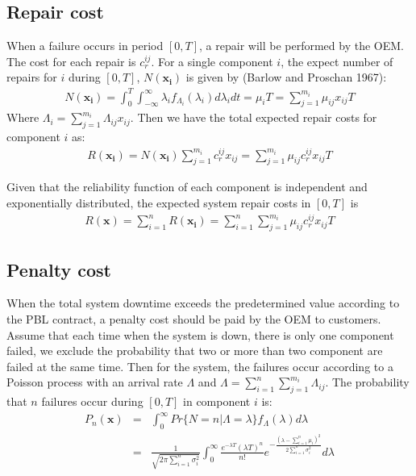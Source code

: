 \documentclass[preprint,12pt]{elsarticle}
\begin{document}
\subsection{Repair cost}
	
When a failure occurs in period $[0, T]$, a repair will be performed by the OEM. The cost for each repair is $c_r^{ij}$. For a single component $i$, the expect number of repairs for $i$ during $[0,T]$, $N(\boldsymbol{x_{i}})$ is given by (Barlow and Proschan 1967):
\begin {eqnarray}
N(\boldsymbol{x_{i}})=\int_0^{T}\int_{-\infty}^{\infty}{{\lambda}_{i}f_{\Lambda_{i}}({\lambda}_{i})d{\lambda}_{i}dt}=\mu_{i}T=\sum_{j=1}^{m_{i}}{\mu_{ij}x_{ij}}T
\end {eqnarray}
Where $\Lambda_{i}=\sum_{j=1}^{m_{i}}{\Lambda}_{ij}x_{ij}$. Then we have the total expected repair costs for component $i$ as:
\begin {eqnarray}
R(\boldsymbol{x_{i}})=N(\boldsymbol{x_{i}})\sum_{j=1}^{m_{i}}{c_r^{ij}x_{ij}}=\sum_{j=1}^{m_{i}}{\mu_{ij}c_r^{ij}x_{ij}}T
\end {eqnarray}

Given that the reliability function of each component is independent and exponentially distributed, the expected system repair costs in $[0,T]$ is
\begin {eqnarray}
R(\boldsymbol{x})=\sum_{i=1}^{n}R(\boldsymbol{x_{i}})=\sum_{i=1}^{n}\sum_{j=1}^{m_{i}}{\mu_{ij}c_r^{ij}x_{ij}}T
\end {eqnarray}

\subsection{Penalty cost}
When the total system downtime exceeds the predetermined value according to the PBL contract, a penalty cost should be paid by the OEM to customers. Assume that each time when the system is down, there is only one component failed, we exclude the probability that two or more than two component are failed at the same time. Then for the system, the failures occur according to a Poisson process with an arrival rate $\Lambda$ and $\Lambda=\sum_{i=1}^{n}\sum_{j=1}^{m_i}{\Lambda_{ij}}$. The probability that $n$ failures occur during $[0, T]$ in component $i$ is:
\begin {eqnarray}
P_{n}(\boldsymbol{x})&=&\int^{\infty}_{0}{Pr\{N=n|\Lambda=\lambda\}f_{\Lambda}}(\lambda)d\lambda \nonumber\\
&=&\frac{1}{\sqrt{2\pi \sum_{i=1}^{n}{\sigma_{i}^{2}}}}\int^{\infty}_{0}\frac{e^{-\lambda T}(\lambda T)^n}{n!}e^{-\frac{(\lambda -\sum^{n}_{i=1}{\mu_{i}})^{2}}{2\sum^{n}_{i=1}{\sigma_{i}^{2}}}}d\lambda
\end {eqnarray}
\end{document}
